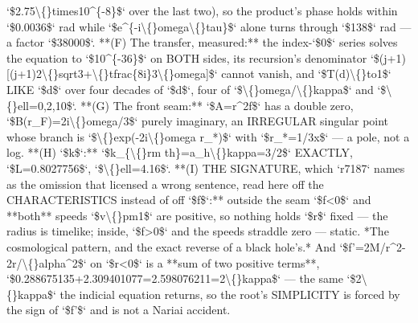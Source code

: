 \begin{description}
`\$2.75\textbackslash\{\}times10\textasciicircum{}\{-8\}\$` over the last two), so the product's phase holds within `\$0.0036\$` rad while `\$e\textasciicircum{}\{-i\textbackslash\{\}omega\textbackslash\{\}tau\}\$` alone turns through `\$138\$` rad --- a factor `\$38000\$`. **(F) The transfer, measured:** the index-`\$0\$` series solves the equation to `\$10\textasciicircum{}\{-36\}\$` on BOTH sides, its recursion's denominator `\$(j+1)[(j+1)2\textbackslash\{\}sqrt3+\textbackslash\{\}tfrac\{8i\}3\textbackslash\{\}omega]\$` cannot vanish, and `\$\textbar{}T(d)\textbar{}\textbackslash\{\}to1\$` LIKE `\$d\$` over four decades of `\$d\$`, four of `\$\textbackslash\{\}omega/\textbackslash\{\}kappa\$` and `\$\textbackslash\{\}ell=0,2,10\$`. **(G) The front seam:** `\$A=r\textasciicircum{}2f\$` has a double zero, `\$B(r\_F)=2i\textbackslash\{\}omega/3\$` purely imaginary, an IRREGULAR singular point whose branch is `\$\textbackslash\{\}exp(-2i\textbackslash\{\}omega r\_*)\$` with `\$r\_*=1/3x\$` --- a pole, not a log. **(H) `\$k\$`:** `\$k\_\{\textbackslash\{\}rm th\}=a\_h\textbackslash\{\}kappa=3/2\$` EXACTLY, `\$L=0.8027756\$`, `\$\textbackslash\{\}ell=4.16\$`. **(I) THE SIGNATURE, which `r7187` names as the omission that licensed a wrong sentence, read here off the CHARACTERISTICS instead of off `\$f\$`:** outside the seam `\$f<0\$` and **both** speeds `\$v\textbackslash\{\}pm1\$` are positive, so nothing holds `\$r\$` fixed --- the radius is timelike; inside, `\$f>0\$` and the speeds straddle zero --- static. *The cosmological pattern, and the exact reverse of a black hole's.* And `\$f'=2M/r\textasciicircum{}2-2r/\textbackslash\{\}alpha\textasciicircum{}2\$` on `\$r<0\$` is a **sum of two positive terms**, `\$0.288675135+2.309401077=2.598076211=2\textbackslash\{\}kappa\$` --- the same `\$2\textbackslash\{\}kappa\$` the indicial equation returns, so the root's SIMPLICITY is forced by the sign of `\$f'\$` and is not a Nariai accident.

\end{description}
